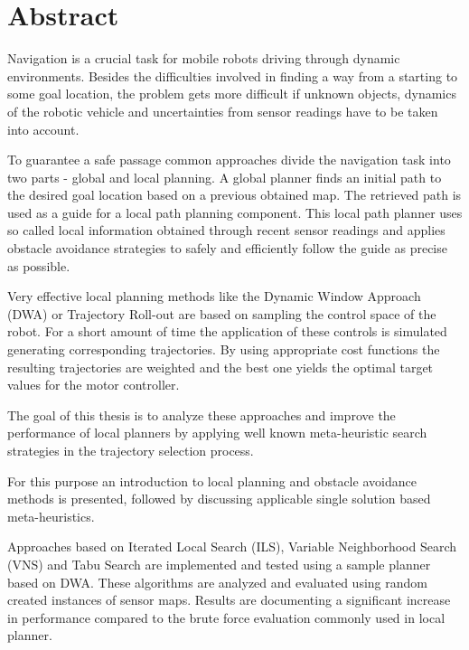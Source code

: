 \begingroup
\let\clearpage\relax
\let\cleardoublepage\relax
\let\cleardoublepage\relax

\chapter*{Abstract}
Navigation is a crucial task for mobile robots driving through dynamic environments.
Besides the difficulties involved in finding a way from a starting to some goal location, the problem gets more difficult if unknown objects, dynamics of the robotic vehicle and uncertainties from sensor readings have to be taken into account.

To guarantee a safe passage common approaches divide the navigation task into two parts - global and local planning.
A global planner finds an initial path to the desired goal location based on a previous obtained map. The retrieved path is used as a guide for a local path planning component.
This local path planner uses so called local information obtained through recent sensor readings and applies obstacle avoidance strategies to safely and efficiently follow the guide as precise as possible. 

Very effective local planning methods like the Dynamic Window Approach (DWA) or Trajectory Roll-out are based on sampling the control space of the robot. 
For a short amount of time the application of these controls is simulated generating corresponding trajectories.
By using appropriate cost functions the resulting trajectories are weighted and the best one yields the optimal target values for the motor controller.

The goal of this thesis is to analyze these approaches and improve the performance of local planners by applying well known meta-heuristic search strategies in the trajectory selection process.

For this purpose an introduction to local planning and obstacle avoidance methods is presented, followed by discussing applicable single solution based meta-heuristics. 

Approaches based on Iterated Local Search (ILS), Variable Neighborhood Search (VNS) and Tabu Search are implemented and tested using a sample planner based on DWA. 
These algorithms are analyzed and evaluated using random created instances of sensor maps. Results are documenting a significant increase in performance compared to the brute force evaluation commonly used in local planner. 

